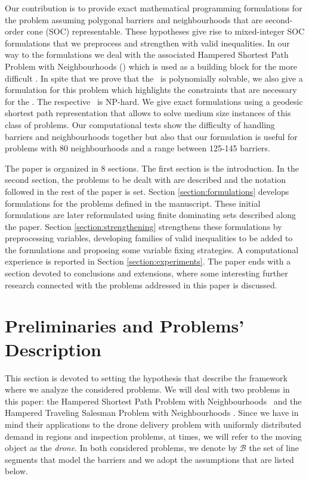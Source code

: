 \documentclass[a4paper,  review, authoryear, 1p.]{elsarticle}
\newcommand{\SPPN}{{\sf{H-SPPN}\xspace }}
\newcommand{\TSPN}{{\sf{H-TSPN}\xspace }}
\begin{document}
		Our contribution is to provide exact mathematical programming formulations for the problem assuming polygonal barriers and neighbourhoods that are second-order cone (SOC) representable. These hypotheses give rise to mixed-integer SOC formulations that we preprocess and strengthen with valid inequalities. In our way to the formulations we deal with the associated Hampered Shortest Path Problem with Neighbourhoods (\SPPN ) which is used as a building block for the more difficult \TSPN . In spite that we prove that the \SPPN \ is polynomially solvable, we also give a formulation for this problem which highlights the constraints that are necessary for the \TSPN. The respective \TSPN \ is NP-hard. We give exact formulations using a geodesic shortest path representation that allows to solve medium size instances of this class of problems. Our computational tests show the difficulty of handling barriers and neighbourhoods together  but also that our formulation is useful for problems with 80 neighbourhoods and a range between 125-145 barriers.
		
	
			The paper is organized in 8 sections. The first section is the introduction. In the second section, the problems to be dealt with are described and the notation followed in the rest of the paper is set. Section \ref{section:formulations} develops formulations for the problems defined in the manuscript. These initial formulations are later reformulated using finite dominating sets described along the paper.
			Section \ref{section:strengthening}  strengthens these formulations  by preprocessing variables, developing  families of  valid inequalities to be added to the formulations and proposing some variable fixing strategies. A computational experience is reported in Section \ref{section:experiments}. The paper ends with a section devoted to conclusions and extensions, where some interesting further research connected with the problems addressed in this paper is discussed.
		
		
		\section{Preliminaries and Problems'  Description \label{section:description}}
		This section is devoted to setting the hypothesis that describe the framework where we analyze the considered problems.
		We will deal with two problems in this paper: the Hampered Shortest Path Problem with Neighbourhoods \SPPN \ and the Hampered Traveling Salesman Problem with Neighbourhoods \TSPN. Since we have in mind their applications to the drone delivery problem with uniformly distributed demand in regions and inspection problems, at times, we will refer to the moving object as the \textit{drone}. In both considered problems, we denote by $\mathcal{B}$ the set of line segments that model the barriers and we adopt the  assumptions that are listed below.
		
\end{document}
